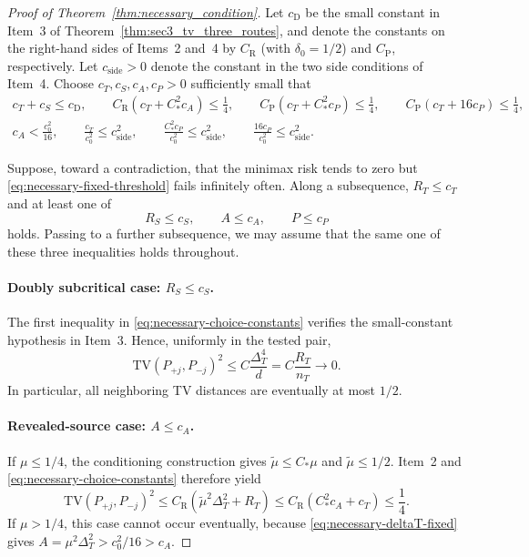 \documentclass[10pt]{article}
\newcommand{\TV}{\mathrm{TV}}
\newcommand{\trg}{T}
\newcommand{\nT}{n_{\trg}}
\newcommand{\DeltaT}{\Delta_{\trg}}
\begin{document}
\begin{proof}[Proof of Theorem~\ref{thm:necessary_condition}]
Let $c_{\mathrm D}$ be the small constant in Item~3 of
Theorem~\ref{thm:sec3_tv_three_routes}, and denote the constants on the
right-hand sides of Items~2 and~4 by $C_{\mathrm R}$ (with
$\delta_0=1/2$) and $C_{\mathrm P}$, respectively. Let $c_{\mathrm{side}}>0$
denote the constant in the two side conditions of Item~4. Choose
$c_T,c_S,c_A,c_P>0$ sufficiently small that
\begin{equation}
\label{eq:necessary-choice-constants}
\begin{gathered}
    c_T+c_S\le c_{\mathrm D},\qquad
    C_{\mathrm R}(c_T+C_*^2c_A)\le\frac14,\qquad
    C_{\mathrm P}(c_T+C_*^2c_P)\le\frac14,\qquad
    C_{\mathrm P}(c_T+16c_P)\le\frac14,\\
    c_A<\frac{c_0^2}{16},\qquad
    \frac{c_T}{c_0^2}\le c_{\mathrm{side}}^2,\qquad
    \frac{C_*^2c_P}{c_0^2}\le c_{\mathrm{side}}^2,\qquad
    \frac{16c_P}{c_0^2}\le c_{\mathrm{side}}^2.
\end{gathered}
\end{equation}

Suppose, toward a contradiction, that the minimax risk tends to zero but
\eqref{eq:necessary-fixed-threshold} fails infinitely often. Along a
subsequence, $R_T\le c_T$ and at least one of
\[
    R_S\le c_S,\qquad A\le c_A,\qquad P\le c_P
\]
holds. Passing to a further subsequence, we may assume that the same one of
these three inequalities holds throughout.

\paragraph{Doubly subcritical case: $R_S\le c_S$.}
The first inequality in \eqref{eq:necessary-choice-constants} verifies the
small-constant hypothesis in Item~3. Hence, uniformly in the tested pair,
\[
    \TV(P_{+j},P_{-j})^2
    \le C\frac{\DeltaT^4}{d}
    =C\frac{R_T}{\nT}\to0.
\]
In particular, all neighboring TV distances are eventually at most $1/2$.

\paragraph{Revealed-source case: $A\le c_A$.}
If $\mu\le1/4$, the conditioning construction gives
$\tilde\mu\le C_*\mu$ and $\tilde\mu\le1/2$. Item~2 and
\eqref{eq:necessary-choice-constants} therefore yield
\[
    \TV(P_{+j},P_{-j})^2
    \le C_{\mathrm R}(\tilde\mu^2\DeltaT^2+R_T)
    \le C_{\mathrm R}(C_*^2c_A+c_T)\le\frac14.
\]
If $\mu>1/4$, this case cannot occur eventually, because
\eqref{eq:necessary-deltaT-fixed} gives
$A=\mu^2\DeltaT^2>c_0^2/16>c_A$.


\end{proof}
\end{document}
